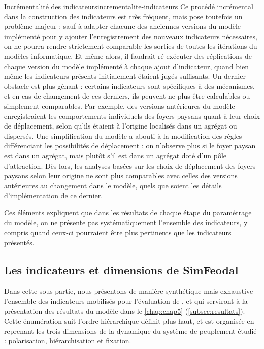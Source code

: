 \begin{encadre}{Incrémentalité des indicateurs}{incrementalite-indicateurs}
Ce procédé incrémental dans la construction des indicateurs est très fréquent, mais pose toutefois un problème majeur :
sauf à adapter chacune des anciennes versions du modèle implémenté pour y ajouter l'enregistrement des nouveaux indicateurs nécessaires, on ne pourra rendre strictement comparable les sorties de toutes les itérations du modèles informatique.
Et même alors, il faudrait ré-exécuter des réplications de chaque version du modèle implémenté à chaque ajout d'indicateur, quand bien même les indicateurs présents initialement étaient jugés suffisants.
Un dernier obstacle est plus gênant :
certains indicateurs sont spécifiques à des mécanismes, et en cas de changement de ces derniers, ils peuvent ne plus être calculables ou simplement comparables.
Par exemple, des versions antérieures du modèle enregistraient les comportements individuels des foyers paysans quant à leur \og choix\fg{} de déplacement, selon qu'ils étaient à l'origine localisés dans un agrégat ou dispersés.
Une simplification du modèle a abouti à la modification des règles différenciant les possibilités de déplacement :
on n'observe plus si le foyer paysan est dans un agrégat, mais plutôt s'il est dans un agrégat doté d'un pôle d'attraction.
Dès lors, les analyses basées sur les choix de déplacement des foyers paysans selon leur origine ne sont plus comparables avec celles des versions antérieures au changement dans le modèle, quels que soient les détails d'implémentation de ce dernier.

Ces éléments expliquent que dans les résultats de chaque étape du paramétrage du modèle, on ne présente pas systématiquement l'ensemble des indicateurs, y compris quand ceux-ci pourraient être plus pertinents que les indicateurs présentés.
\end{encadre}

\clearpage
\subsection{Les indicateurs et dimensions de SimFeodal \label{subsec:indicateurs-simfeodal}}

Dans cette sous-partie, nous présentons de manière synthétique mais exhaustive l'ensemble des indicateurs mobilisés pour l'évaluation de \simfeodal{}, et qui serviront à la présentation des résultats du modèle dans le \cref{chap:chap5} (\cref{subsec:resultats}).
Cette énumération suit l'ordre hiérarchique définit plus haut, et est organisée en reprenant les trois dimensions de la dynamique du système de peuplement étudié : polarisation, hiérarchisation et fixation.

